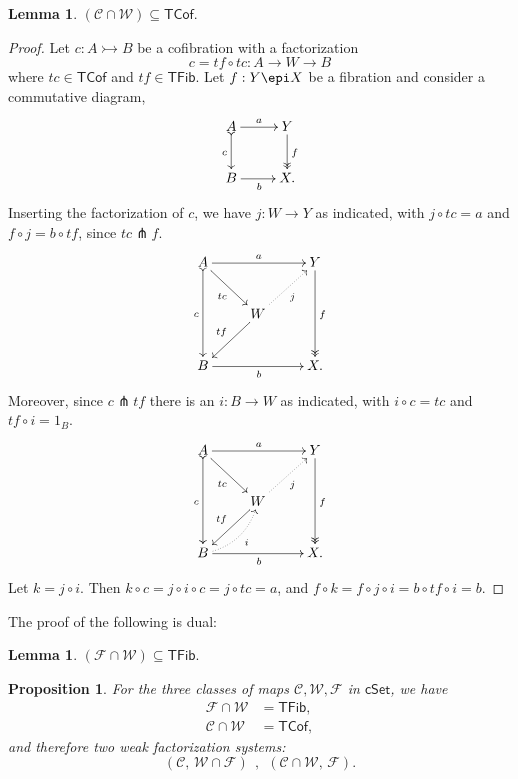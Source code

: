 \documentclass[12pt]{article}
\newcommand{\cSet}{\ensuremath{\mathsf{cSet}}}
\newcommand{\mono}{\ensuremath{\rightarrowtail}}
\newcommand{\ra}{\ensuremath{\rightarrow}}
\newtheorem{proposition}[theorem]{Proposition}
\newtheorem{lemma}[theorem]{Lemma}
\theoremstyle{remark}
\theoremstyle{definition}
\begin{document}
\begin{lemma}
$(\mathcal{C} \cap \mathcal{W})  \subseteq \mathsf{TCof}.$
\end{lemma}
\begin{proof}
Let $c : A\mono B$ be a cofibration with a factorization $$c = tf\circ tc : A \ra W\ra B$$ where $tc\in\mathsf{TCof}$ and $tf\in\mathsf{TFib}$.  Let $f:Y\epi X$ be a fibration and consider a commutative diagram,
\begin{equation*}%
\xymatrix{
A \ar@{>->}[d]_{c} \ar[r]^-{a}  & Y \ar@{>>}[d]^{f} \\
B \ar[r]_{b} &  X.
}
\end{equation*}
Inserting the factorization of $c$, we have $j : W\ra Y$ as indicated, with $j\circ tc = a$ and $f\circ j = b\circ tf$, since $tc \pitchfork f$.
\begin{equation*}%
\xymatrix{
A \ar@{>->}[dd]_{c} \ar[rd]_{tc} \ar[rr]^-{a}  && Y \ar@{>>}[dd]^{f} \\
& W \ar[ld]_{tf} \ar@{.>}[ru]_{j} & \\
B \ar[rr]_{b} &&  X.
}
\end{equation*}
Moreover, since $c\pitchfork tf$ there is an $i : B \ra W$ as indicated, with $i\circ c = tc$ and $tf\circ i = 1_B$.
\begin{equation*}%
\xymatrix{
A \ar@{>->}[dd]_{c} \ar[rd]_{tc} \ar[rr]^-{a}  && Y \ar@{>>}[dd]^{f} \\
& W \ar[ld]_{tf} \ar@{.>}[ru]_{j} & \\
B \ar[rr]_{b} \ar@{.>}@/_2ex/[ru]_--{i} &&  X.
}
\end{equation*}
Let $k = j\circ i$. Then $k \circ c = j\circ i \circ c = j \circ tc = a$, and $f \circ k = f\circ j\circ i = b\circ tf\circ i = b$.
\end{proof}

The proof of the following is dual:
\begin{lemma}
$(\mathcal{F} \cap \mathcal{W})  \subseteq \mathsf{TFib}.$
\end{lemma}

\begin{proposition}\label{prop:FWC}
For the three classes of maps $\mathcal{C}, \mathcal{W}, \mathcal{F}$ in \cSet, we have 
\begin{align*}
\mathcal{F}\cap\mathcal{W} &= \mathsf{TFib}, \\
\mathcal{C}\cap\mathcal{W} &= \mathsf{TCof},
\end{align*}
and therefore two weak factorization systems:
\[
(\mathcal{C},\, \mathcal{W}\cap\mathcal{F})\ \ ,\ \ (\mathcal{C}\cap\mathcal{W},\, \mathcal{F}).
\]
\end{proposition}
\end{document}
